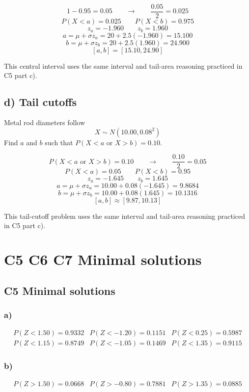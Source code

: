 	\[
	1-0.95=0.05
	\qquad \longrightarrow \qquad
	\frac{0.05}{2}=0.025
	\]
	\[
	P(X<a)=0.025
	\qquad
	P(X<b)=0.975
	\]
	\[
	z_a=-1.960
	\qquad
	z_b=1.960
	\]
	\[
	a=\mu+\sigma z_a
	=20+2.5(-1.960)
	=15.100
	\]
	\[
	b=\mu+\sigma z_b
	=20+2.5(1.960)
	=24.900
	\]
	\[
	[a,b]=[15.10,24.90]
	\]
	
	This central interval uses the same interval and tail-area reasoning practiced in C5 part c).
	
	
	\subsection*{d) Tail cutoffs}
	\label{subsec:inverse-normal-problems-c7-d}
	Metal rod diameters follow
	\[
	X\sim N(10.00,0.08^2)
	\]
	Find \(a\) and \(b\) such that \(P(X<a\text{ or }X>b)=0.10\).
	
	\[
	P(X<a\text{ or }X>b)=0.10
	\qquad \longrightarrow \qquad
	\frac{0.10}{2}=0.05
	\]
	\[
	P(X<a)=0.05
	\qquad
	P(X<b)=0.95
	\]
	\[
	z_a=-1.645
	\qquad
	z_b=1.645
	\]
	\[
	a=\mu+\sigma z_a
	=10.00+0.08(-1.645)
	=9.8684
	\]
	\[
	b=\mu+\sigma z_b
	=10.00+0.08(1.645)
	=10.1316
	\]
	\[
	[a,b]\approx[9.87,10.13]
	\]
	
	This tail-cutoff problem uses the same interval and tail-area reasoning practiced in C5 part c).
	
	

\section{C5 C6 C7 Minimal solutions}

\subsection{C5 Minimal solutions}

\subsubsection*{a)}
\[
\begin{array}{lll}
	P(Z<1.50)=0.9332
	&
	P(Z<-1.20)=0.1151
	&
	P(Z<0.25)=0.5987
	\\[0.2cm]
	P(Z<1.15)=0.8749
	&
	P(Z<-1.05)=0.1469
	&
	P(Z<1.35)=0.9115
\end{array}
\]

\subsubsection*{b)}
\[
\begin{array}{lll}
	P(Z>1.50)=0.0668
	&
	P(Z>-0.80)=0.7881
	&
	P(Z>1.35)=0.0885
\end{array}
\]

